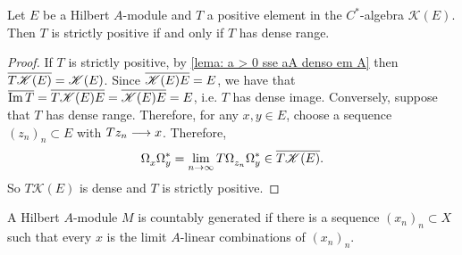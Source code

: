 \begin{proposicao}
\label{prop: T > 0 sse Im T densa}
Let $E$ be a Hilbert $A$-module and $T$ a positive element in the $C^*$-algebra $\mathscr K(E)$. Then $T$ is strictly positive if and only if $T$ has dense range.
\begin{proof}
If $T$ is strictly positive, by \ref{lema: a > 0 sse aA denso em A} then $\overline{T\mathscr K(E)} = \mathscr K(E)$. Since $\overline{\mathscr K(E)E} = E$, we have that $\overline{\operatorname{Im} T} = \overline{T\mathscr K(E)E} = \overline{\mathscr K(E)E} = E$, i.e. $T$ has dense image. Conversely, suppose that $T$ has dense range. Therefore, for any $x,y \in E$, choose a sequence $(z_n)_n\subset E$ with $Tz_n \longrightarrow x$. Therefore,
\[
\Omega_x^{\vphantom{*}}\Omega_y^* = \lim_{n\to \infty} T\Omega_{z_n}^{\vphantom{*}}\Omega_y^* \in \overline{T\mathscr K(E)}.
\]
So $T\mathscr K(E)$ is dense and $T$ is strictly positive.
\end{proof}
\end{proposicao}

A Hilbert $A$-module $M$ is countably generated if there is a sequence $\left(x_{n}\right)_n \subset X$ such that every $x$ is the limit $A$-linear combinations of $\left(x_{n}\right)_n$.

